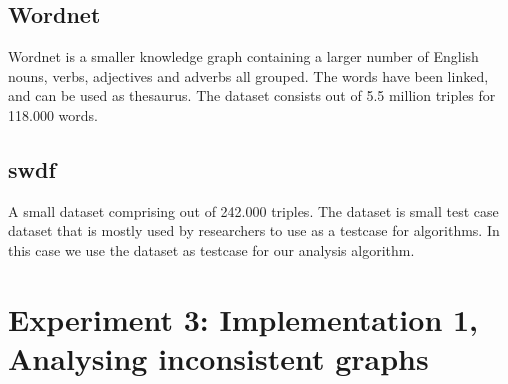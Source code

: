 \documentclass[11pt,letterpaper ,oneside ]{book}
\begin{document}
	\subsection{Wordnet}
	Wordnet is a smaller knowledge graph containing a larger number of English nouns, verbs, adjectives and adverbs all grouped. The words have been linked, and can be used as thesaurus. The dataset consists out of 5.5 million triples for 118.000 words.
	
	\subsection{swdf}
	A small dataset comprising out of 242.000 triples. The dataset is small test case dataset that is mostly used by researchers to use as a testcase for algorithms. In this case we use the dataset as testcase for our analysis algorithm.
	
	\section{Experiment 3: Implementation 1, Analysing inconsistent graphs}
\end{document}
